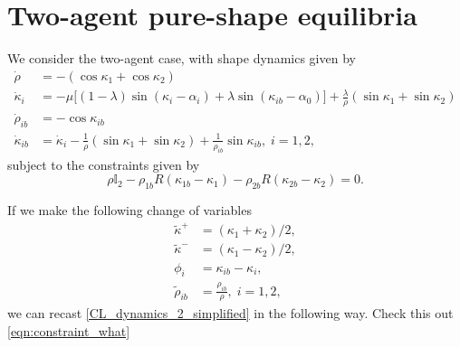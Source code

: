 \section{Two-agent pure-shape equilibria}
We consider the two-agent case, with shape dynamics given by
\begin{align}
\label{CL_dynamics_2_simplified}
\dot{\rho} &= - (\cos\kappa_1 + \cos\kappa_2) \nonumber \\
\dot{\kappa}_i &= - \mu \Big[(1 - \lambda)\sin(\kappa_i - \alpha_i) + \lambda \sin(\kappa_{ib} - \alpha_0) \Big] + \frac{\lambda}{\rho}(\sin\kappa_1 + \sin\kappa_2) \nonumber \\
\dot{\rho}_{ib} &= - \cos\kappa_{ib} \nonumber \\
\dot{\kappa}_{ib} &= \dot{\kappa}_i - \frac{1}{\rho}(\sin\kappa_1 + \sin\kappa_2) + \frac{1}{\rho_{ib}} \sin\kappa_{ib},  \; i=1,2,
\end{align}
subject to the constraints given by
\begin{equation}
\rho \mathbb{I}_2 - \rho_{1b} R(\kappa_{1b} - \kappa_1) - \rho_{2b} R(\kappa_{2b} - \kappa_{2}) = 0. 
\label{eqn:constraint_what}
\end{equation}

If we make the following change of variables
\begin{align}
\tilde{\kappa}^+ &= (\kappa_1 + \kappa_2)/2, \nonumber \\
\tilde{\kappa}^- &= (\kappa_1 - \kappa_2)/2, \nonumber \\
\phi_{i} &= \kappa_{ib} - \kappa_i, \nonumber \\
\tilde{\rho}_{ib} &= \frac{\rho_{ib} }{\rho}, \; i=1,2,
\end{align}
we can recast \eqref{CL_dynamics_2_simplified} in the following way. Check this out \eqref{eqn:constraint_what}
  
  
  
  
  
  
  
  
  
  
  
  